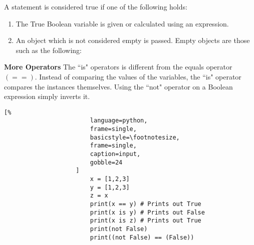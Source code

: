 \documentclass[crop=false,class=article,oneside]{standalone}
\begin{document}
                A statement is considered true if one of the
                following holds:
                \begin{enumerate}
                    \item The True Boolean variable is given or
                        calculated using an expression.
                    \item An object which is not considered empty is
                        passed. Empty objects are those such as the
                        following:
                    \begin{enumerate}
                    \end{enumerate}
                \end{enumerate}
            \textbf{More Operators}
                The ``is" operators is different from the equals
                operator $(==)$. Instead of comparing the values of
                the variables, the ``is" operator compares the
                instances themselves. Using the ``not" operator on a
                Boolean expression simply inverts it.\newline
                \begin{minipage}[t]{.48\textwidth}
                    \centering
                    \begin{lstlisting}[%
                        language=python,
                        frame=single,
                        basicstyle=\footnotesize,
                        frame=single,
                        caption=input,
                        gobble=24
                    ]
                        x = [1,2,3]
                        y = [1,2,3]
                        z = x
                        print(x == y) # Prints out True
                        print(x is y) # Prints out False
                        print(x is z) # Prints out True
                        print(not False)
                        print((not False) == (False))
                    \end{lstlisting}
                \end{minipage}\hfill
\end{document}
